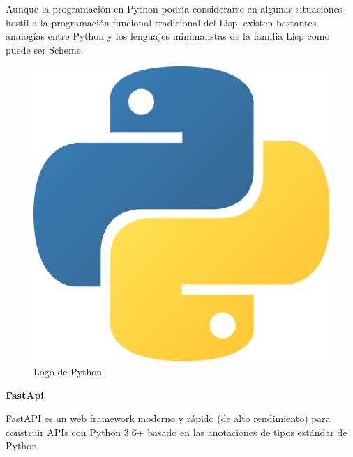 Aunque la programación en Python podría considerarse en algunas situaciones hostil a la programación funcional tradicional del Lisp, existen bastantes analogías entre Python y los lenguajes minimalistas de la familia Lisp como puede ser Scheme.

\begin{figure}[!htb]
    \centering
    \includegraphics[scale=0.1]{TT/img/analisis/pythonlogo.png}
    \caption{Logo de Python}
    \label{graphic:PythonLogo}    
\end{figure}

\textbf{FastApi}

FastAPI es un web framework moderno y rápido (de alto rendimiento) para construir APIs con Python 3.6+ basado en las anotaciones de tipos estándar de Python.


